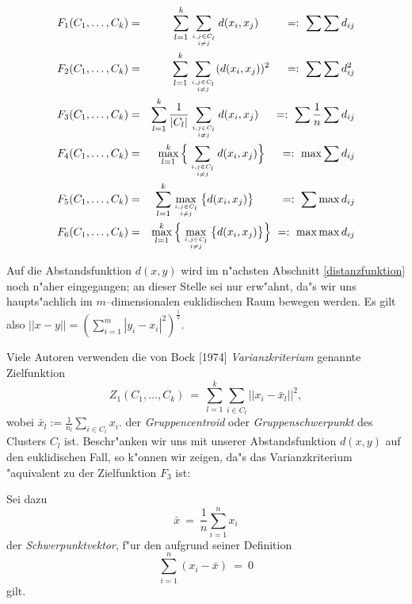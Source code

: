 \begin{eqnarray*}
F_1(C_1,\dots,C_k) & = &  \sum\limits_{l=1}^k \sum\limits_{i,j \in C_l 
	\atop i \neq j} d(x_i,x_j) \  \qquad =:  \ \sum \sum d_{ij} \\
F_2(C_1,\dots,C_k) & = &  \sum\limits_{l=1}^k \sum\limits_{i,j \in C_l 
	\atop i \neq j} (d(x_i,x_j))^2\   \quad =:\ \sum \sum d_{ij}^2 \\
F_3(C_1,\dots,C_k) & = &  \sum\limits_{l=1}^k \frac{1}{|C_l|}\sum\limits_{i,j 
	\in C_l \atop i \neq j} d(x_i,x_j)\ \quad  =:\ \sum \frac 1n \sum d_{ij} \\
F_4(C_1,\dots,C_k) & = &  \max\limits_{l=1}^k \Big\{\sum\limits_{i,j \in C_l 
	\atop i \neq j} d(x_i,x_j)\Big\} \ \quad =:  \ \max \sum d_{ij} \\
F_5(C_1,\dots,C_k) & = &  \sum\limits_{l=1}^k \max\limits_{i,j \in C_l 
	\atop i \neq j} \big\{d(x_i,x_j)\big\} \qquad \ =:  \ \sum \max d_{ij} \\
F_6(C_1,\dots,C_k) & = & \max\limits_{l=1}^k \Big\{\max\limits_{i,j \in C_l 
	\atop i \neq j} \big\{d(x_i,x_j)\big\}\Big\}  \ =: \  \max \max d_{ij} 
\end{eqnarray*}

Auf die Abstandsfunktion $d(x,y)$ wird im n"achsten Abschnitt
\ref{distanzfunktion} noch n"aher eingegangen;
an dieser Stelle sei nur erw"ahnt, da"s wir uns haupts"achlich im
$m$--dimensionalen euklidischen Raum bewegen werden.
Es gilt also $|| x - y || = (\sum_{i=1}^m |y_i - x_i |^2)^{\frac 12}$.

Viele Autoren verwenden die von Bock [1974] {\em Varianzkriterium} 
genannte Zielfunktion
\begin{equation}
	Z_1(C_1,\dots,C_k) \ =  \ \sum_{l=1}^k \sum_{i \in C_l}
		|| x_i - \bar x_l ||^2,
\end{equation}
wobei 
$\bar x_l := \frac 1 {n_l} \sum_{i \in C_l} x_i$.
der {\em Gruppencentroid} oder {\em Gruppenschwerpunkt}
des Clusters $C_l$ ist. 
Beschr"anken wir uns mit unserer Abstandsfunktion $d(x,y)$ auf den
euklidischen Fall, so k"onnen wir zeigen, da"s das Varianzkriterium
"aquivalent zu der Zielfunktion $F_3$ ist:

Sei dazu
\[ \bar x \ = \ \frac 1 n \sum _{i=1}^n x_i \]
der {\em Schwerpunktvektor}, f"ur den aufgrund seiner Definition
\begin{equation}
	\label{ximinusxquer}
	\sum_{i=1}^n (x_i - \bar x) \ =  \ 0
\end{equation}
gilt.

